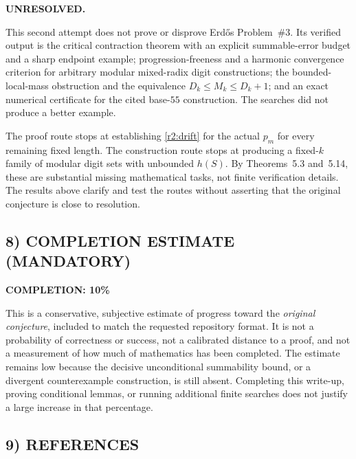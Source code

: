 \noindent\textbf{UNRESOLVED.}

This second attempt does not prove or disprove Erd\H{o}s Problem~\#3. Its verified output is the critical contraction theorem with an explicit summable-error budget and a sharp endpoint example; progression-freeness and a harmonic convergence criterion for arbitrary modular mixed-radix digit constructions; the bounded-local-mass obstruction and the equivalence $D_k\le M_k\le D_k+1$; and an exact numerical certificate for the cited base-$55$ construction. The searches did not produce a better example.

The proof route stops at establishing \eqref{r2:drift} for the actual $p_m$ for every remaining fixed length. The construction route stops at producing a fixed-$k$ family of modular digit sets with unbounded $h(S)$. By Theorems~5.3 and~5.14, these are substantial missing mathematical tasks, not finite verification details. The results above clarify and test the routes without asserting that the original conjecture is close to resolution.

\subsection{8) COMPLETION ESTIMATE (MANDATORY)}

\noindent\textbf{COMPLETION: 10\%}

This is a conservative, subjective estimate of progress toward the \emph{original conjecture}, included to match the requested repository format. It is not a probability of correctness or success, not a calibrated distance to a proof, and not a measurement of how much of mathematics has been completed. The estimate remains low because the decisive unconditional summability bound, or a divergent counterexample construction, is still absent. Completing this write-up, proving conditional lemmas, or running additional finite searches does not justify a large increase in that percentage.

\subsection{9) REFERENCES}


